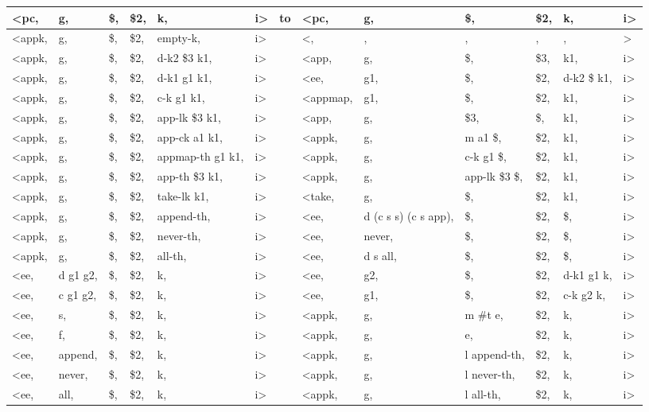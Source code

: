 \documentclass[12pt]{article} %
\begin{document}
\begin{center}
\begin{tabular}{llllllcllllll}
<pc, & g, & \$, & \$2, & k, & i> & to & <pc, & g, & \$, & \$2, & k, & i> \\
\hline
<appk, & g, & \$, & \$2, & empty-k, & i> &  & <, &, &, &, &, &> \\
<appk, & g, & \$, & \$2, & d-k2 \$3 k1, & i> & & <app, & g, & \$, & \$3, & k1, & i>\\
<appk, & g, & \$, & \$2, & d-k1 g1 k1, & i> & & <ee, & g1, & \$, & \$2, & d-k2 \$ k1, & i>\\
<appk, & g, & \$, & \$2, & c-k g1 k1, & i> & & <appmap, & g1, & \$, & \$2, & k1, & i>\\
<appk, & g, & \$, & \$2, & app-lk \$3 k1, & i> & & <app, & g, & \$3, & \$, & k1, & i>\\
<appk, & g, & \$, & \$2, & app-ck a1 k1, & i> & & <appk, & g, & m a1 \$, & \$2, & k1, & i>\\
<appk, & g, & \$, & \$2, & appmap-th g1 k1, & i> & & <appk, & g, & c-k g1 \$, & \$2, & k1, & i>\\
<appk, & g, & \$, & \$2, & app-th \$3 k1, & i> & & <appk, & g, & app-lk \$3 \$, & \$2, & k1, & i>\\
<appk, & g, & \$, & \$2, & take-lk k1, & i> & & <take, & g, & \$, & \$2, & k1, & i>\\
<appk, & g, & \$, & \$2, & append-th, & i> & & <ee, & d (c s s) (c s app), & \$, & \$2, & \$, & i>\\
<appk, & g, & \$, & \$2, & never-th, & i> & & <ee, & never, & \$, & \$2, & \$, & i>\\
<appk, & g, & \$, & \$2, & all-th, & i> & & <ee, & d s all, & \$, & \$2, & \$, & i>\\
<ee, & d g1 g2, & \$, & \$2, & k, & i> & & <ee, & g2, & \$, & \$2, & d-k1 g1 k, & i>\\
<ee, & c g1 g2, & \$, & \$2, & k, & i> & & <ee, & g1, & \$, & \$2, & c-k g2 k, & i>\\
<ee, & s, & \$, & \$2, & k, & i> & & <appk, & g, & m \#t e, & \$2, & k, & i>\\
<ee, & f, & \$, & \$2, & k, & i> & & <appk, & g, & e, & \$2, & k, & i>\\
<ee, & append, & \$, & \$2, & k, & i> & & <appk, & g, & l append-th, & \$2, & k, & i>\\
<ee, & never, & \$, & \$2, & k, & i> & & <appk, & g, & l never-th, & \$2, & k, & i>\\
<ee, & all, & \$, & \$2, & k, & i> & & <appk, & g, & l all-th, & \$2, & k, & i>\\

\end{tabular}
\end{center}
\end{document}
